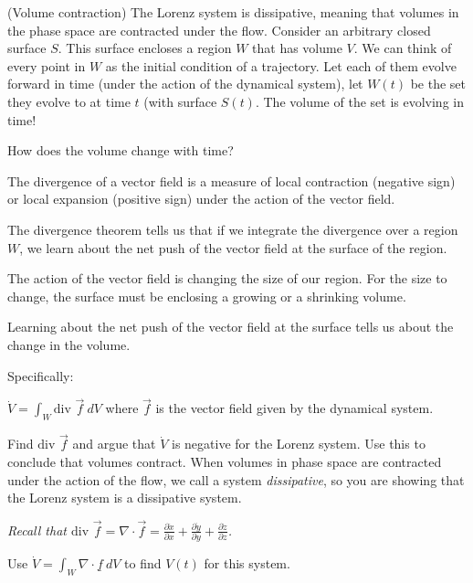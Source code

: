 \documentclass[12pt,letterpaper,noanswers]{exam}
\begin{document}
\begin{questions}





\item (Volume contraction) The Lorenz system is dissipative, meaning that volumes in the phase space are contracted under the flow.  Consider an arbitrary closed surface $S$.  This surface encloses a region $W$ that has volume $V$.  We can think of every point in $W$ as the initial condition of a trajectory.  Let each of them evolve forward in time (under the action of the dynamical system), let $W(t)$ be the set they evolve to at time $t$ (with surface $S(t)$.  The volume of the set is evolving in time!


How does the volume change with time?  

The divergence of a vector field is a measure of local contraction (negative sign) or local expansion (positive sign) under the action of the vector field.

The divergence theorem tells us that if we integrate the divergence over a region $W$, we learn about the net push of the vector field at the surface of the region.  

The action of the vector field is changing the size of our region.  For the size to change, the surface must be enclosing a growing or a shrinking volume.

Learning about the net push of the vector field at the surface tells us about the change in the volume.

Specifically:

$\displaystyle \dot{V} = \int_W \text{div }\vec{f}\ dV$ where $\vec f$ is the vector field given by the dynamical system.  
\begin{parts}
\item Find $\text{div }\vec f$ and argue that $\dot{V}$ is negative for the Lorenz system.  Use this to conclude that volumes contract.  When volumes in phase space are contracted under the action of the flow, we call a system \emph{dissipative}, so you are showing that the Lorenz system is a dissipative system.

\emph{Recall that $\text{div }\vec f = \nabla \cdot \vec f = \frac{\partial \dot x}{\partial x} + \frac{\partial \dot y}{\partial y} + \frac{\partial \dot z}{\partial z}$.}

\item Use $\dot V = \int_W \nabla \cdot \underline{f}\ dV$ to find $V(t)$ for this system.


\end{parts}
\end{questions}
\end{document}

